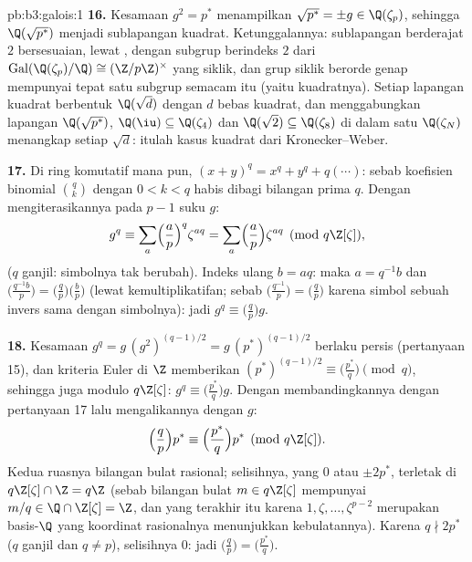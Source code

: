 \begin{solution}{pb:b3:galois:1}
\textbf{16.} Kesamaan $g^2 = p^*$ menampilkan $\sqrt{p^*} = \pm g \in
\Q(\zeta_p)$, sehingga $\Q(\sqrt{p^*})$ menjadi sublapangan kuadrat.
Ketunggalannya: sublapangan berderajat $2$ bersesuaian, lewat , dengan subgrup berindeks $2$ dari
$\operatorname{Gal}(\Q(\zeta_p)/\Q) \cong (\Z/p\Z)^\times$ yang siklik,
dan grup siklik berorde genap mempunyai tepat satu subgrup
semacam itu (yaitu kuadratnya). Setiap lapangan kuadrat berbentuk
$\Q(\sqrt{d})$ dengan $d$ bebas kuadrat, dan menggabungkan lapangan
$\Q(\sqrt{p^*})$, $\Q(\iu) \subseteq \Q(\zeta_4)$ dan
$\Q(\sqrt2) \subseteq \Q(\zeta_8)$ di dalam satu
$\Q(\zeta_N)$ menangkap setiap $\sqrt d$: itulah kasus kuadrat dari
Kronecker--Weber.

\textbf{17.} Di ring komutatif mana pun, $(x + y)^q = x^q + y^q
+ q(\cdots)$: sebab koefisien binomial $\binom qk$ dengan $0 < k <
q$ habis dibagi bilangan prima $q$. Dengan mengiterasikannya pada $p - 1$
suku $g$:
\[
g^q \equiv \sum_{a}\Bigl(\frac ap\Bigr)^{q}\zeta^{aq}
= \sum_a\Bigl(\frac ap\Bigr)\zeta^{aq}
\pmod{q\Z[\zeta]},
\]
($q$ ganjil: simbolnya tak berubah). Indeks ulang $b = aq$: maka $a =
q^{-1}b$ dan $\bigl(\frac{q^{-1}b}p\bigr) =
\bigl(\frac{q}p\bigr)\bigl(\frac bp\bigr)$ (lewat kemultiplikatifan;
sebab $\bigl(\frac{q^{-1}}p\bigr) = \bigl(\frac qp\bigr)$ karena
simbol sebuah invers sama dengan simbolnya): jadi $g^q \equiv
\bigl(\frac qp\bigr)g$.

\textbf{18.} Kesamaan $g^q = g\,(g^2)^{(q-1)/2} = g\,(p^*)^{(q-1)/2}$
berlaku persis (pertanyaan 15), dan kriteria Euler di $\Z$ memberikan
$(p^*)^{(q-1)/2} \equiv \bigl(\frac{p^*}q\bigr) \pmod q$,
sehingga juga modulo $q\Z[\zeta]$: $g^q \equiv \bigl(\frac{p^*}q\bigr)g$.
Dengan membandingkannya dengan pertanyaan 17 lalu mengalikannya dengan $g$:
\[
\Bigl(\frac qp\Bigr)p^* \equiv \Bigl(\frac{p^*}q\Bigr)p^*
\pmod{q\Z[\zeta]} .
\]
Kedua ruasnya bilangan bulat rasional; selisihnya, yang $0$ atau
$\pm2p^*$, terletak di $q\Z[\zeta] \cap \Z = q\Z$ (sebab bilangan bulat $m
\in q\Z[\zeta]$ mempunyai $m/q \in \Q \cap \Z[\zeta] = \Z$, dan
yang terakhir itu karena $1, \zeta, \dots, \zeta^{p-2}$ merupakan
basis-$\Q$ yang koordinat rasionalnya menunjukkan
kebulatannya). Karena $q \nmid 2p^*$ ($q$ ganjil dan $q \neq p$),
selisihnya $0$: jadi $\bigl(\frac qp\bigr) =
\bigl(\frac{p^*}q\bigr)$.


\end{solution}
